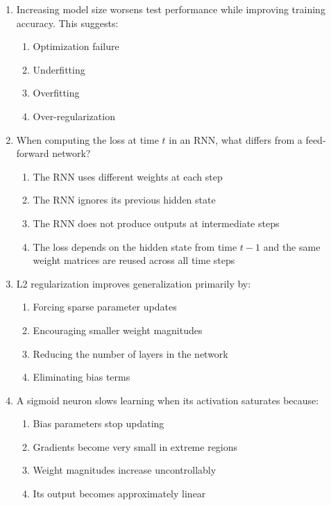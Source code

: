 \documentclass[12pt]{article}
\begin{document}
\begin{enumerate}[label=Q\arabic*.]
 \item Increasing model size worsens test performance while improving training accuracy. This suggests:
 \begin{enumerate}[label=(\Alph*)]
     \item Optimization failure
     \item Underfitting
     \item Overfitting
     \item Over-regularization
 \end{enumerate}
 
 \item When computing the loss at time $t$ in an RNN, what differs from a feed-forward network?
 \begin{enumerate}[label=(\Alph*)]
     \item The RNN uses different weights at each step
     \item The RNN ignores its previous hidden state
     \item The RNN does not produce outputs at intermediate steps
     \item The loss depends on the hidden state from time $t-1$ and the same weight matrices are reused across all time steps
 \end{enumerate}
 
 \item L2 regularization improves generalization primarily by:
 \begin{enumerate}[label=(\Alph*)]
     \item Forcing sparse parameter updates
     \item Encouraging smaller weight magnitudes
     \item Reducing the number of layers in the network
     \item Eliminating bias terms
 \end{enumerate}
 
 \item A sigmoid neuron slows learning when its activation saturates because:
 \begin{enumerate}[label=(\Alph*)]
     \item Bias parameters stop updating
     \item Gradients become very small in extreme regions
     \item Weight magnitudes increase uncontrollably
     \item Its output becomes approximately linear
 \end{enumerate}
 

\end{enumerate}
\end{document}

